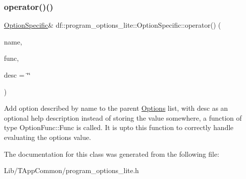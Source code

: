 \subsubsection{\texorpdfstring{operator()()}{operator()()}\hspace{0.1cm}{\footnotesize\ttfamily [2/2]}}
{\footnotesize\ttfamily \hyperlink{classdf_1_1program__options__lite_1_1_option_specific}{Option\+Specific}\& df\+::program\+\_\+options\+\_\+lite\+::\+Option\+Specific\+::operator() (\begin{DoxyParamCaption}\item[{const std\+::string \&}]{name,  }\item[{Option\+Func\+::\+Func $\ast$}]{func,  }\item[{const std\+::string \&}]{desc = {\ttfamily \char`\"{}\char`\"{}} }\end{DoxyParamCaption})\hspace{0.3cm}{\ttfamily [inline]}}

Add option described by name to the parent \hyperlink{structdf_1_1program__options__lite_1_1_options}{Options} list, with desc as an optional help description instead of storing the value somewhere, a function of type Option\+Func\+::\+Func is called. It is upto this function to correctly handle evaluating the option\textquotesingle{}s value. 

The documentation for this class was generated from the following file\+:\begin{DoxyCompactItemize}
\item 
Lib/\+T\+App\+Common/program\+\_\+options\+\_\+lite.\+h\end{DoxyCompactItemize}
